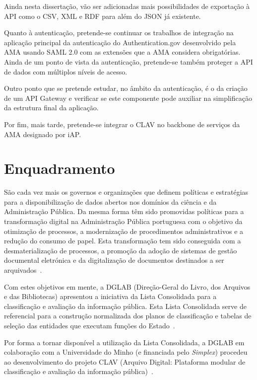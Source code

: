 \documentclass{article}
\begin{document}
Ainda nesta dissertação, vão ser adicionadas mais possibilidades de exportação à API como o CSV, XML e RDF para além do JSON já existente.

Quanto à autenticação, pretende-se continuar os trabalhos de integração na aplicação principal da autenticação do Authentication.gov desenvolvido pela AMA usando SAML 2.0 com as extensões que a AMA considera obrigatórias. Ainda de um ponto de vista da autenticação, pretende-se também proteger a API de dados com múltiplos níveis de acesso.

Outro ponto que se pretende estudar, no âmbito da autenticação, é o da criação de um API Gateway e verificar se este componente pode auxiliar na simplificação da estrutura final da aplicação.

Por fim, mais tarde, pretende-se integrar o CLAV no backbone de serviços da AMA designado por iAP.

\section*{Enquadramento}

São cada vez mais os governos e organizações que definem políticas e estratégias para a disponibilização de dados abertos nos domínios da ciência e da Administração Pública. Da mesma forma têm sido promovidas políticas para a transformação digital na Administração Pública portuguesa com o objetivo da otimização de processos, a modernização de procedimentos administrativos e a redução do consumo de papel. Esta transformação tem sido conseguida com a desmaterialização de processos, a promoção da adoção de sistemas de gestão documental eletrónica e da digitalização de documentos destinados a ser arquivados~\cite{clav1}.

Com estes objetivos em mente, a DGLAB (Direção-Geral do Livro, dos Arquivos e das Bibliotecas) apresentou a iniciativa da Lista Consolidada para a classificação e avaliação da informação pública. Esta Lista Consolidada serve de referencial para a construção normalizada dos planos de classificação e tabelas de seleção das entidades que executam funções do Estado~\cite{clav1}. 

Por forma a tornar disponível a utilização da Lista Consolidada, a DGLAB em colaboração com a Universidade do Minho (e financiada pelo \textit{Simplex}) procedeu ao desenvolvimento do projeto CLAV (Arquivo Digital: Plataforma modular de classificação e avaliação da informação pública)~\cite{clav2}.
\end{document}
